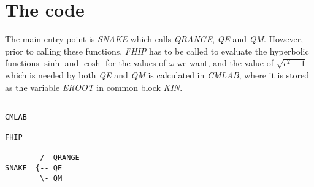 \section{The code}

The main entry point is \emph{SNAKE} which calls \emph{QRANGE}, \emph{QE} and
\emph{QM}. However, prior to calling these functions, \emph{FHIP} has to be
called to evaluate the hyperbolic functions $\sinh$ and $\cosh$ for the
values of $\omega$ we want, and the value of $\sqrt{\epsilon^2 - 1}$ which
is needed by both \emph{QE} and \emph{QM} is calculated in \emph{CMLAB}, where
it is stored as the variable \emph{EROOT} in common block \emph{KIN}.


\begin{verbatim}

CMLAB

FHIP

        /- QRANGE
SNAKE  {-- QE
        \- QM
\end{verbatim}
